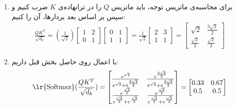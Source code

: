 \begin{ابجد}
\item
\begin{enumerate}
    \item برای محاسبه‌ی ماتریس توجه، باید ماتریس $Q$ را در ترانهاده‌ی $K$ ضرب کنیم و سپس بر اساس بعد بردارها، آن را  کنیم:
          \begin{align*}
              \frac{QK^T}{\sqrt{d_k}} = (\frac{1}{\sqrt{2}}) \begin{bmatrix} 1 & 2 \\ 0 & 1\end{bmatrix} \begin{bmatrix} 0 & 1 \\ 1 & 1\end{bmatrix} = \frac{1}{\sqrt{2}} \begin{bmatrix} 2 & 3 \\ 1 & 1\end{bmatrix} = \begin{bmatrix} \sqrt{2} & \frac{3\sqrt{2}}{2} \\ \frac{\sqrt{2}}{2} & \frac{\sqrt{2}}{2} \end{bmatrix}
          \end{align*}

    \item با اعمال  روی حاصل بخش قبل داریم:
          \begin{align*}
              \text{\lr{Softmax}}(\frac{QK^T}{\sqrt{d_k}}) = \begin{bmatrix} \frac{e^{\sqrt{2}}}{e^{\sqrt{2}} + e^{\frac{3\sqrt{2}}{2}}} & \frac{e^{\frac{3\sqrt{2}}{2}}}{e^{\sqrt{2}} + e^{\frac{3\sqrt{2}}{2}}} \\ \frac{e^{\frac{\sqrt{2}}{2}}}{e^{\frac{\sqrt{2}}{2}} + e^{\frac{\sqrt{2}}{2}}} & \frac{e^{\frac{\sqrt{2}}{2}}}{e^{\frac{\sqrt{2}}{2}} + e^{\frac{\sqrt{2}}{2}}} \end{bmatrix} = \begin{bmatrix} 0.33 & 0.67 \\ 0.5 & 0.5 \end{bmatrix}
          \end{align*}


\end{enumerate}
\end{ابجد}
